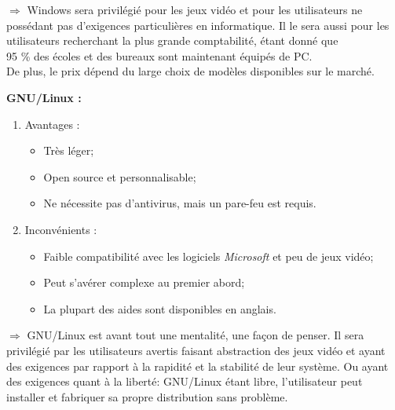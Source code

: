 $\Rightarrow$ Windows sera privilégié pour les jeux vidéo et pour les
utilisateurs ne possédant pas d'exigences particulières en informatique.
Il le sera aussi pour les utilisateurs recherchant la plus grande comptabilité,
étant donné que \\
95 \% des écoles et des bureaux sont maintenant équipés de PC. \\
De plus, le prix dépend du large choix de modèles disponibles sur le marché. \\

\newpage

\textbf{GNU/Linux :}

\begin{enumerate}
\item Avantages : \\

  \begin{itemize}
  \item Très léger; \\

  \item Open source et personnalisable; \\

  \item Ne nécessite pas d'antivirus, mais un pare-feu est requis. \\
  \end{itemize}

\item Inconvénients : \\

  \begin{itemize}
  \item Faible compatibilité avec les logiciels \textit{Microsoft} et peu de jeux
vidéo; \\

  \item Peut s'avérer complexe au premier abord; \\

  \item La plupart des aides sont disponibles en anglais. \\
  \end{itemize}
\end{enumerate}

$\Rightarrow$ GNU/Linux est avant tout une mentalité, une façon de penser.
Il sera privilégié par les utilisateurs avertis faisant abstraction des jeux
vidéo et ayant des exigences par rapport à la rapidité et la stabilité de leur
système. Ou ayant des exigences quant à la liberté: GNU/Linux étant libre,
l'utilisateur peut installer et fabriquer sa propre distribution sans problème.  \\

